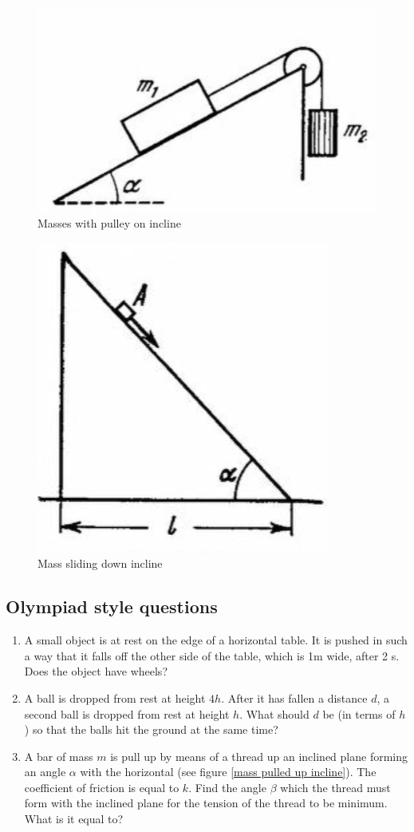 \documentclass{article}
\begin{document}
\begin{figure}
    \centering
    \includegraphics[width=0.5\linewidth]{assets/masses with pulley on incline.png}
    \caption{Masses with pulley on incline}
    \label{masses with pulley on incline}
\end{figure}



\begin{figure}
    \centering
    \includegraphics[width=0.5\linewidth]{assets/masses sliding down incline.png}
    \caption{Mass sliding down incline}
    \label{mass sliding down incline}
\end{figure}

\subsection{Olympiad style questions}
\begin{enumerate}
\item A small object is at rest on the edge of a horizontal table. It is pushed in such a way that it falls off the other side of the table, which is 1m wide, after 2 s. Does the object have wheels?

\item A ball is dropped from rest at height $4h$. After it has fallen a distance $d$, a second ball is
dropped from rest at height $h$. What should $d$ be (in terms of $h$) so that the balls hit the
ground at the same time?

\item A bar of mass $m$ is pull up by means of a thread up an inclined plane forming an angle $\alpha$ with the horizontal (see figure \ref{mass pulled up incline}). The coefficient of friction is equal to $k$. Find the angle $\beta$ which the thread must form with the inclined plane for the tension of the thread to be minimum. What is it equal to?
\end{enumerate}
\end{document}
